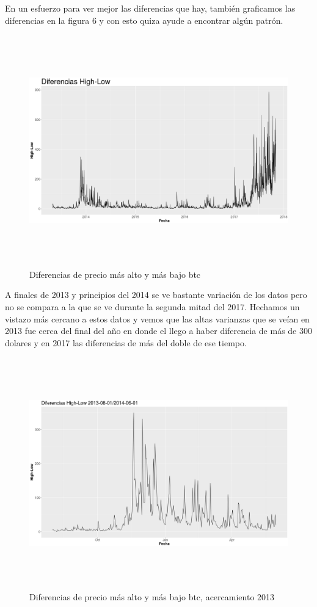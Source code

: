 \documentclass[12pt,letterpaper]{article}
\begin{document}
    En un esfuerzo para ver mejor las diferencias que hay, tambi\'en graficamos las diferencias en la figura 6 y con esto quiza ayude a encontrar alg\'un patr\'on.

    \begin{figure}
        \centering

        \includegraphics[width = 18cm, height = 10cm]{btc/diferencias_BTC_HighLow}

        \caption{Diferencias de precio m\'as alto y m\'as bajo btc}
    \end{figure}

    A finales de 2013 y principios del 2014 se ve bastante variaci\'on de los datos pero no se compara a la que se ve durante la segunda mitad del 2017. Hechamos un vistazo m\'as cercano a estos datos y vemos que las altas varianzas que se ve\'ian en 2013 fue cerca del final del a\~no en donde el llego a haber diferencia de m\'as de 300 dolares y en 2017 las diferencias de m\'as del doble de ese tiempo.

    \begin{figure}
        \centering

        \includegraphics[width = 18cm, height = 10cm]{btc/diferencias_BTC_HighLow_1}

        \caption{Diferencias de precio m\'as alto y m\'as bajo btc, acercamiento 2013}
    \end{figure}
\end{document}
